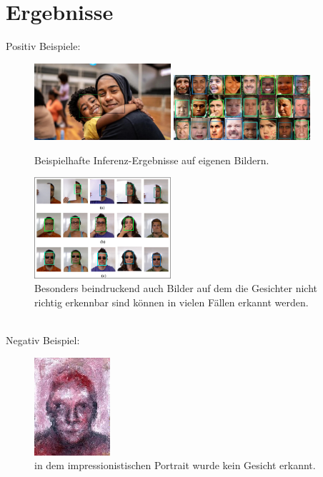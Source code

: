 \documentclass[11pt,a4paper]{article}
\begin{document}
\section{Ergebnisse}
Positiv Beispiele:
\begin{figure}[h!]
\centering
\includegraphics[width=0.45\textwidth]{../inference_results/people.jpg}
\includegraphics[width=0.45\textwidth]{../inference_results/common-emotions.jpg}
\caption{Beispielhafte Inferenz-Ergebnisse auf eigenen Bildern.}
\end{figure}
\begin{figure}[h!]
\centering
\includegraphics[width=0.45\textwidth]{../inference_results/ocluded.png}
\caption{Besonders beindruckend auch Bilder auf dem die Gesichter nicht richtig erkennbar sind können in vielen Fällen erkannt werden.}
\end{figure}\\
Negativ Beispiel:
\begin{figure}[h!]
\centering
\includegraphics[width=0.25\textwidth]{../inference_results/foggy-painting.jpg}
\caption{in dem impressionistischen Portrait wurde kein Gesicht erkannt.}
\end{figure}
\end{document}
